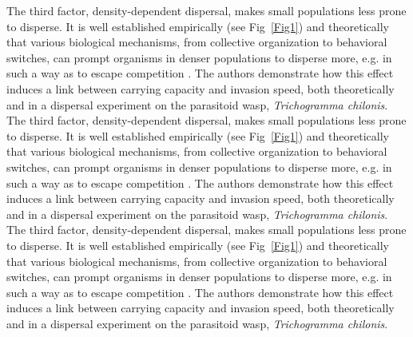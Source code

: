 \documentclass[a4paper]{article}
\begin{document}
The third factor, density-dependent dispersal, makes small populations less prone to disperse. It is well established empirically (see Fig~\ref{Fig1}) and theoretically that various biological mechanisms, from collective organization to behavioral switches, can prompt organisms in denser populations to disperse more, e.g. in such a way as to escape competition \parencite{matthysen2005density}. The authors demonstrate how this effect induces a link between carrying capacity and invasion speed, both theoretically and in a dispersal experiment on the parasitoid wasp, \emph{Trichogramma chilonis}.\\ 
The third factor, density-dependent dispersal, makes small populations less prone to disperse. It is well established empirically (see Fig~\ref{Fig1}) and theoretically that various biological mechanisms, from collective organization to behavioral switches, can prompt organisms in denser populations to disperse more, e.g. in such a way as to escape competition \parencite{matthysen2005density}. The authors demonstrate how this effect induces a link between carrying capacity and invasion speed, both theoretically and in a dispersal experiment on the parasitoid wasp, \emph{Trichogramma chilonis}.\\ 
The third factor, density-dependent dispersal, makes small populations less prone to disperse. It is well established empirically (see Fig~\ref{Fig1}) and theoretically that various biological mechanisms, from collective organization to behavioral switches, can prompt organisms in denser populations to disperse more, e.g. in such a way as to escape competition \parencite{matthysen2005density}. The authors demonstrate how this effect induces a link between carrying capacity and invasion speed, both theoretically and in a dispersal experiment on the parasitoid wasp, \emph{Trichogramma chilonis}.\\ 
\end{document}
